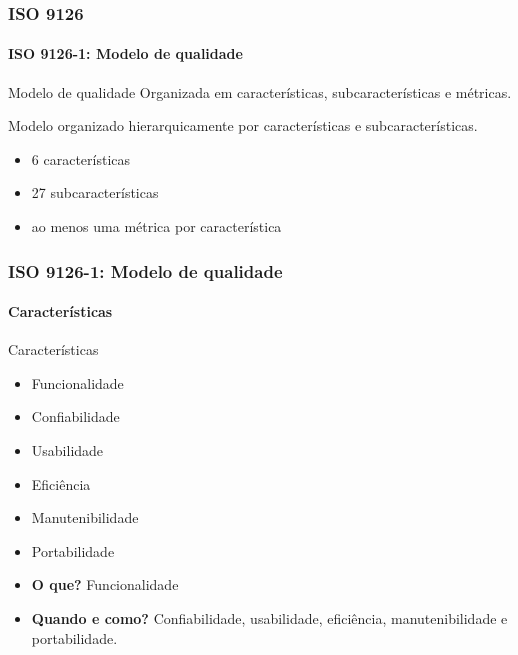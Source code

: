 \begin{frame}[hasnext=false, hasprev=true]
	\frametitle{ISO 9126}
	\framesubtitle{ISO 9126-1: Modelo de qualidade}
	
	\begin{block:fact}{Modelo de qualidade}
		Organizada em características, subcaracterísticas e métricas.
	\end{block:fact}
	
	\begin{block:fact}{}
		Modelo organizado hierarquicamente por características e subcaracterísticas.
		\begin{itemize}
			\item 6 características
			\item 27 subcaracterísticas
			\item ao menos uma métrica por característica
		\end{itemize}
	\end{block:fact}
\end{frame}


\begin{frame}
	\frametitle{ISO 9126-1: Modelo de qualidade}
	\framesubtitle{Características}
	
	\begin{block:fact}{Características}
		\begin{itemize}
			\item Funcionalidade
			\item Confiabilidade
			\item Usabilidade
			\item Eficiência
			\item Manutenibilidade
			\item Portabilidade
		\end{itemize}
	\end{block:fact}

	\begin{block:fact}{}
		\begin{itemize}
			\item \textbf{O que?} Funcionalidade
			\item \textbf{Quando e como?} Confiabilidade, usabilidade, eficiência,
			manutenibilidade e portabilidade.
		\end{itemize}
	\end{block:fact}
\end{frame}


